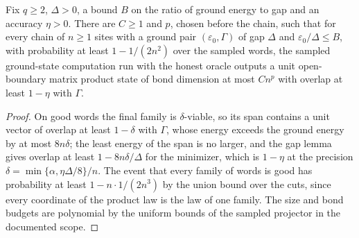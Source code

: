 \begin{theorem}
    \label{thm:lvv_sampled_program_success}
    \leanok
    Fix $q\ge2$, $\Delta>0$, a bound $B$ on the ratio of ground energy to gap and
    an accuracy $\eta>0$. There are $C\ge1$ and $p$, chosen before the chain,
    such that for every chain of $n\ge1$ sites with a ground pair
    $(\varepsilon_0,\Gamma)$ of gap $\Delta$ and $\varepsilon_0/\Delta\le B$,
    with probability at least $1-1/(2n^2)$ over the sampled words, the sampled
    ground-state computation run with the honest oracle outputs a unit
    open-boundary matrix product state of bond dimension at most $Cn^{p}$ with
    overlap at least $1-\eta$ with $\Gamma$.
\end{theorem}
\begin{proof}
    \leanok
    On good words the final family is $\delta$-viable, so its span contains a
    unit vector of overlap at least $1-\delta$ with $\Gamma$, whose energy exceeds
    the ground energy by at most $8n\delta$; the least energy of the span is no
    larger, and the gap lemma gives overlap at least $1-8n\delta/\Delta$ for the
    minimizer, which is $1-\eta$ at the precision $\delta=\min\{\alpha,
        \eta\Delta/8\}/n$. The event that every family of words is good has
    probability at least $1-n\cdot1/(2n^3)$ by the union bound over the cuts,
    since every coordinate of the product law is the law of one family. The
    size and bond budgets are polynomial by the uniform bounds of the sampled
    projector in the documented scope.
\end{proof}


